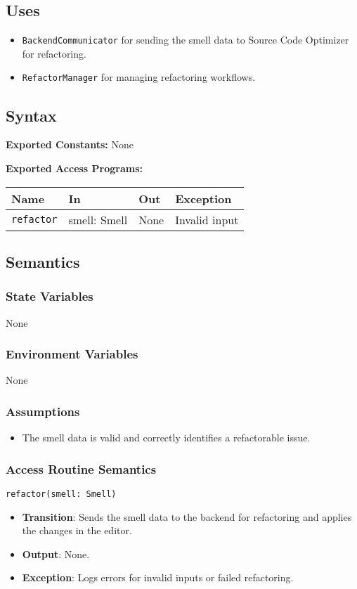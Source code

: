 \documentclass[12pt, titlepage]{article}
\begin{document}
\subsection{Uses}
\begin{itemize}
\item \texttt{BackendCommunicator} for sending the smell data to Source Code Optimizer for refactoring.
\item \texttt{RefactorManager} for managing refactoring workflows.
\end{itemize}

\subsection{Syntax}

\textbf{Exported Constants:} None

\textbf{Exported Access Programs:}\\
\begin{tabularx}{\linewidth}{|l|>{\raggedright\arraybackslash}X|l|l|}
  \hline
  \textbf{Name} & \textbf{In} & \textbf{Out} & \textbf{Exception}\\
  \hline
  \texttt{refactor} & {smell: Smell} & None & Invalid input \\
  \hline
\end{tabularx}

\subsection{Semantics}

\subsubsection{State Variables}
None

\subsubsection{Environment Variables}
None


\subsubsection{Assumptions}
\begin{itemize}
\item The smell data is valid and correctly identifies a refactorable issue.
\end{itemize}

\subsubsection{Access Routine Semantics}
\texttt{refactor(smell: Smell)}
\begin{itemize}
\item \textbf{Transition}: Sends the smell data to the backend for refactoring and applies the changes in the editor.
\item \textbf{Output}: None.
\item \textbf{Exception}: Logs errors for invalid inputs or failed refactoring.
\end{itemize}
\end{document}

